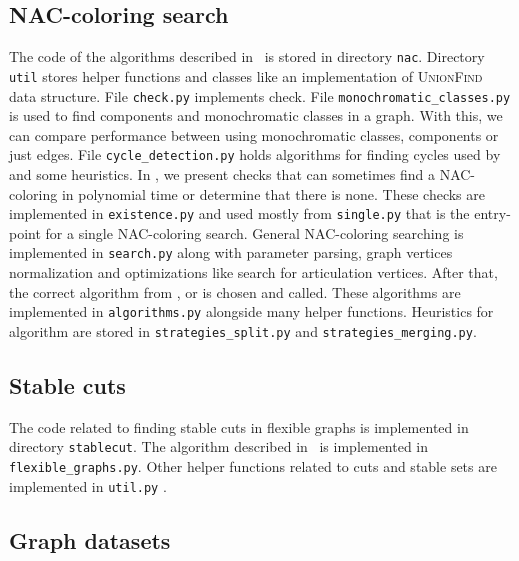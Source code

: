 \subsection{NAC-coloring search}

The code of the algorithms described in~
is stored in directory \texttt{nac}.
%
Directory \texttt{util} stores helper functions and classes
like an implementation of \textsc{UnionFind} data structure.
%
File \texttt{check.py} implements \IsNACColoring{} check.
%
File \texttt{monochromatic\_classes.py} is used to find \trcon{} components
and monochromatic classes in a graph. With this, we can compare performance
between using monochromatic classes, \trcon{} components or just edges.
%
File \texttt{cycle\_detection.py} holds algorithms for finding cycles
used by 
and some heuristics.
%
In ,
we present checks that can
sometimes find a NAC-coloring in polynomial time
or determine that there is none.
These checks are implemented in \texttt{existence.py} and
used mostly from \texttt{single.py} that is the entry-point
for a single NAC-coloring search.
%
General NAC-coloring searching is implemented in \texttt{search.py}
along with parameter parsing, graph vertices normalization and
optimizations like search for articulation vertices.
After that, the correct algorithm from \Naive{}, \NaiveCycles{} or \Subgraphs{}
is chosen and called.
%
These algorithms are implemented in \texttt{algorithms.py} alongside many helper functions.
Heuristics for \Subgraphs{} algorithm are stored in \texttt{strategies\_split.py}
and \texttt{strategies\_merging.py}.


\subsection{Stable cuts}

The code related to finding stable cuts in flexible graphs
is implemented in directory \texttt{stablecut}.
%
The algorithm described in~
is implemented in \texttt{flexible\_graphs.py}.
Other helper functions related to cuts and stable sets
are implemented in \texttt{util.py}%
.


\subsection{Graph datasets}

